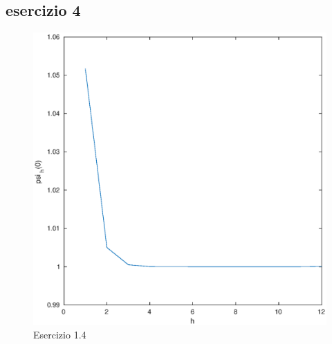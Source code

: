 \documentclass[11pt]{extarticle}
\begin{document}
\subsection{esercizio 4}
\begin{figure}[h]
\caption{Esercizio 1.4}
\label{fes1.4}
\includegraphics[width=\textwidth]{plot/fes4.eps}
\end{figure}
\end{document}
